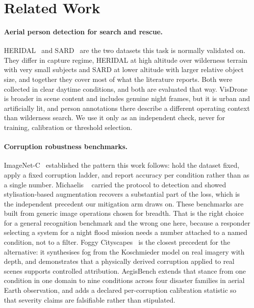 \section{Related Work}
\label{sec:related}

\paragraph{Aerial person detection for search and rescue.}
HERIDAL~\cite{bozic2019heridal} and SARD~\cite{sambolek2021sard} are the
two datasets this task is normally validated on. They differ in capture
regime, HERIDAL at high altitude over wilderness terrain with very small
subjects and SARD at lower altitude with larger relative object size,
and together they cover most of what the literature reports. Both were
collected in clear daytime conditions, and both are evaluated that way.
VisDrone~\cite{zhu2022visdrone} is broader in scene content and includes
genuine night frames, but it is urban and artificially lit, and person
annotations there describe a different operating context than wilderness
search. We use it only as an independent check, never for training,
calibration or threshold selection.

\paragraph{Corruption robustness benchmarks.}
ImageNet-C~\cite{hendrycks2019imagenetc} established the pattern this
work follows: hold the dataset fixed, apply a fixed corruption ladder,
and report accuracy per condition rather than as a single number.
Michaelis \etal~\cite{michaelis2019benchmarking} carried the protocol to
detection and showed stylisation-based augmentation recovers a
substantial part of the loss, which is the independent precedent our
mitigation arm draws on. These benchmarks are built from generic image
operations chosen for breadth. That is the right choice for a general
recognition benchmark and the wrong one here, because a responder
selecting a system for a night flood mission needs a number attached to
a named condition, not to a filter. Foggy Cityscapes~\cite{sakaridis2018foggy}
is the closest precedent for the alternative: it synthesises fog from
the Koschmieder model on real imagery with depth, and demonstrates that
a physically derived corruption applied to real scenes supports
controlled attribution. AegisBench extends that stance from one
condition in one domain to nine conditions across four disaster families
in aerial Earth observation, and adds a declared per-corruption
calibration statistic so that severity claims are falsifiable rather
than stipulated.

